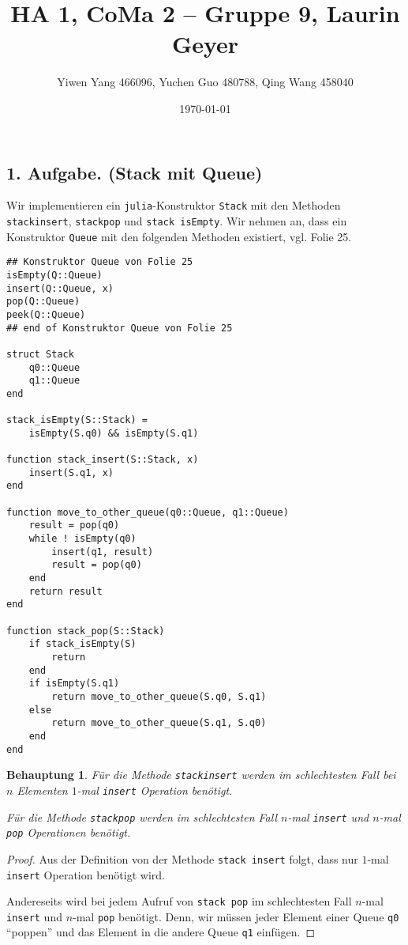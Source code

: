 \documentclass[draft,a5paper]{article}
\author{Yiwen Yang 466096, Yuchen Guo 480788, Qing Wang 458040}
\date{\today}
\title{HA 1, CoMa 2 -- Gruppe 9, Laurin Geyer}
\newtheorem*{beh}{Behauptung}
\begin{document}
\maketitle

\newpage

\subsection*{1. Aufgabe. (Stack mit Queue)}
Wir implementieren ein \texttt{julia}-Konstruktor \texttt{Stack} mit
den Methoden \texttt{stack\textunderscore insert},
\texttt{stack\textunderscore pop} und \texttt{stack\textunderscore
  isEmpty}.  Wir nehmen an, dass ein Konstruktor \texttt{Queue} mit den
folgenden Methoden existiert, vgl. Folie 25.

\begin{verbatim}
## Konstruktor Queue von Folie 25
isEmpty(Q::Queue)
insert(Q::Queue, x)
pop(Q::Queue)
peek(Q::Queue)
## end of Konstruktor Queue von Folie 25

struct Stack
    q0::Queue
    q1::Queue
end

stack_isEmpty(S::Stack) =
    isEmpty(S.q0) && isEmpty(S.q1)

function stack_insert(S::Stack, x)
    insert(S.q1, x)
end

function move_to_other_queue(q0::Queue, q1::Queue)
    result = pop(q0)
    while ! isEmpty(q0)
        insert(q1, result)
        result = pop(q0)
    end
    return result
end

function stack_pop(S::Stack)
    if stack_isEmpty(S)
        return
    end
    if isEmpty(S.q1)
        return move_to_other_queue(S.q0, S.q1)
    else
        return move_to_other_queue(S.q1, S.q0)
    end
end
\end{verbatim}

\newpage

\begin{beh}
  Für die Methode \texttt{stack\textunderscore insert} werden im
  schlechtesten Fall bei \(n\) Elementen \(1\)-mal \texttt{insert}
  Operation benötigt.

  Für die Methode \texttt{stack\textunderscore pop} werden im
  schlechtesten Fall \(n\)-mal \texttt{insert} und \(n\)-mal
  \texttt{pop} Operationen
  benötigt.
\end{beh}

\begin{proof}
  Aus der Definition von der Methode \texttt{stack\textunderscore
    insert} folgt, dass nur \(1\)-mal \texttt{insert} Operation
  benötigt wird.

  Andereseits wird bei jedem Aufruf von \texttt{stack\textunderscore
    pop} im schlechtesten Fall \(n\)-mal \texttt{insert} und \(n\)-mal
  \texttt{pop} benötigt.  Denn, wir müssen jeder Element einer
  Queue \texttt{q0} "`poppen"' und das Element in die andere Queue \texttt{q1} einfügen.
\end{proof}
\end{document}
